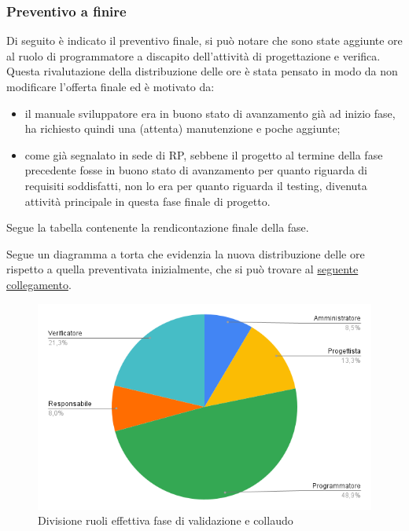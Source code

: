     \subsubsection{Preventivo a finire}
        Di seguito è indicato il preventivo finale, si può notare che sono state aggiunte ore al ruolo di programmatore a discapito dell'attività di progettazione e verifica. Questa rivalutazione della distribuzione delle ore è stata pensato in modo da non modificare l'offerta finale ed è motivato da:
        \begin{itemize}
            \item il manuale sviluppatore era in buono stato di avanzamento già ad inizio fase, ha richiesto quindi una (attenta) manutenzione e poche aggiunte;
            \item come già segnalato in sede di RP, sebbene il progetto al termine della fase precedente fosse in buono stato di avanzamento per quanto riguarda di requisiti soddisfatti, non lo era per quanto riguarda il testing, divenuta attività principale in questa fase finale di progetto.
        \end{itemize}
        Segue la tabella contenente la rendicontazione finale della fase.
        \def\salarycontent{
            {Amministratore,16,20,320},
            {Analista,      0,25,0},
            {Progettista,   25,22,550},
            {Programmatore, 92,15,1380},
            {Responsabile,  15,30,450},
            {Verificatore,  40,15,600},
            {Totale,        188,127,3300},
        }
        
        Segue un diagramma a torta che evidenzia la nuova distribuzione delle ore rispetto a quella preventivata inizialmente, che si può trovare al \hyperref[image:verifica_ruoli]{seguente collegamento}. 
        \begin{figure}[H]
            \centering
            \includegraphics[width=\textwidth]{source/img/verifica_ruoli_modificato.png}
            \caption{Divisione ruoli effettiva fase di validazione e collaudo}
        \end{figure}

